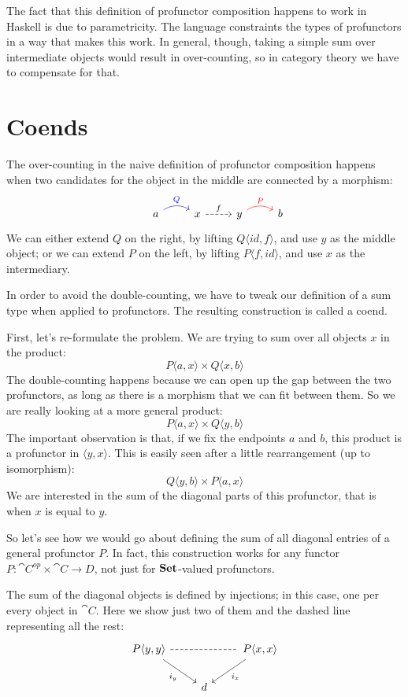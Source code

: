 \documentclass[DaoFP]{subfiles}
\begin{document}
The fact that this definition of profunctor composition happens to work in Haskell is due to parametricity. The language constraints the types of profunctors in a way that makes this work. In general, though, taking a simple sum over intermediate objects would result in over-counting, so in category theory we have to compensate for that.

\section{Coends}

The over-counting in the naive definition of profunctor composition happens when two candidates for the object in the middle are connected by a morphism:
\[
 \begin{tikzcd}
  & a
  \arrow[r, bend left, blue, "Q"]
  &x
  \arrow[r, dashed, "f"]
 & y
  \arrow[r, bend left, red, "P"]
 & b
  \end{tikzcd}
\]
We can either extend $Q$ on the right, by lifting $Q \langle id, f \rangle$, and use $y$ as the middle object; or we can extend $P$ on the left, by lifting $P \langle f, id \rangle$, and use $x$ as the intermediary.

In order to avoid the double-counting, we have to tweak our definition of a sum type when applied to profunctors. The resulting construction is called a coend. 

First, let's re-formulate the problem. We are trying to sum over all objects $x$ in the product:
\[ P \langle a, x \rangle \times Q \langle x, b \rangle \]
The double-counting happens because we can open up the gap between the two profunctors, as long as there is a morphism that we can fit between them. So we are really looking at a more general product:
\[ P \langle a, x \rangle \times Q \langle y, b \rangle \]
The important observation is that, if we fix the endpoints $a$ and $b$, this product is a profunctor in $\langle y, x \rangle$. This is easily seen after a little rearrangement (up to isomorphism):
\[ Q \langle y, b \rangle \times P \langle a, x \rangle \]
We are interested in the sum of the diagonal parts of this profunctor, that is when $x$ is equal to $y$. 

So let's see how we would go about defining the sum of all diagonal entries of a general profunctor $P$. In fact, this construction works for any functor $P \colon \cat C^{op} \times \cat C \to D$, not just for $\mathbf{Set}$-valued profunctors. 

The sum of the diagonal objects is defined by injections; in this case, one per every object in $\cat C$. Here we show just two of them and the dashed line representing all the rest:
\[
 \begin{tikzcd}
 P \langle y, y \rangle
 \arrow[dr, "i_y"']
 \arrow[rr, dash, dashed]
 &&P \langle x, x \rangle
 \arrow[dl, "i_x"]
 \\
 & d
 \end{tikzcd}
\]
\end{document}
